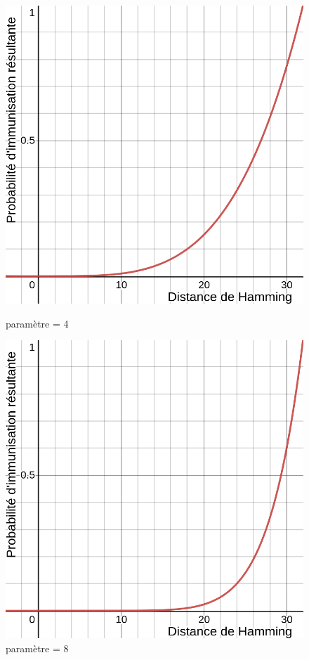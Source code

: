\begin{figure}[h]
  \centering
    \captionsetup{justification=centering}
  \begin{minipage}[b]{0.4\textwidth}
    \includegraphics[width=\textwidth]{Images/fonction_4.png}
    \caption{paramètre = 4}
  \end{minipage}
  \hfill
  \begin{minipage}[b]{0.4\textwidth}
    \includegraphics[width=\textwidth]{Images/fonction_8.png}
    \caption{paramètre = 8}
  \end{minipage}
\end{figure}

